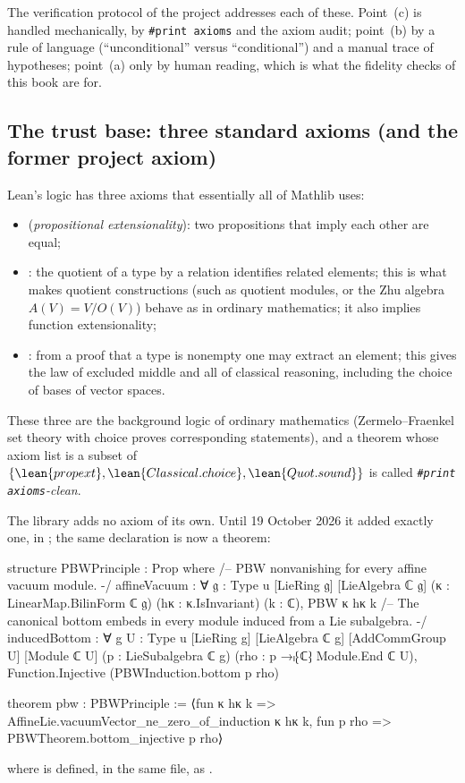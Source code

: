 The verification protocol of the project addresses each of these. Point~(c) is handled
mechanically, by \texttt{\#print axioms} and the axiom audit; point~(b) by a rule of language
(``unconditional'' versus ``conditional'') and a manual trace of hypotheses; point~(a) only by human
reading, which is what the fidelity checks of this book are for.

\subsection{The trust base: three standard axioms (and the former project axiom)}\label{ch15:sec:trust}

Lean's logic has three axioms that essentially all of Mathlib uses:
\begin{itemize}
\item {} (\emph{propositional extensionality}): two propositions that imply each other
  are equal;
\item {}: the quotient of a type by a relation identifies related elements; this
  is what makes quotient constructions (such as quotient modules, or the Zhu algebra
  $A(V)=V/O(V)$) behave as in ordinary mathematics; it also implies function extensionality;
\item {}: from a proof that a type is nonempty one may extract an element;
  this gives the law of excluded middle and all of classical reasoning, including the choice of
  bases of vector spaces.
\end{itemize}
These three are the background logic of ordinary mathematics (Zermelo--Fraenkel set theory with
choice proves corresponding statements), and a theorem whose axiom list is a subset of
$\{\lean{propext},\lean{Classical.choice},\lean{Quot.sound}\}$ is called
\emph{\texttt{\#print axioms}-clean}.

The library adds no axiom of its own. Until 19 October 2026 it added exactly one, in
; the same declaration is now a theorem:
\begin{leancode}
structure PBWPrinciple : Prop where
  /-- PBW nonvanishing for every affine vacuum module. -/
  affineVacuum : ∀ {𝔤 : Type u} [LieRing 𝔤] [LieAlgebra ℂ 𝔤]
      (κ : LinearMap.BilinForm ℂ 𝔤) (hκ : κ.IsInvariant) (k : ℂ),
    PBW κ hκ k
  /-- The canonical bottom embeds in every module induced from a Lie subalgebra. -/
  inducedBottom : ∀ {g U : Type u} [LieRing g] [LieAlgebra ℂ g]
      [AddCommGroup U] [Module ℂ U] (p : LieSubalgebra ℂ g)
      (rho : p →ₗ⁅ℂ⁆ Module.End ℂ U),
    Function.Injective (PBWInduction.bottom p rho)

theorem pbw : PBWPrinciple :=
  ⟨fun κ hκ k => AffineLie.vacuumVector_ne_zero_of_induction κ hκ k,
    fun p rho => PBWTheorem.bottom_injective p rho⟩
\end{leancode}
where  is defined, in the same file, as
.

